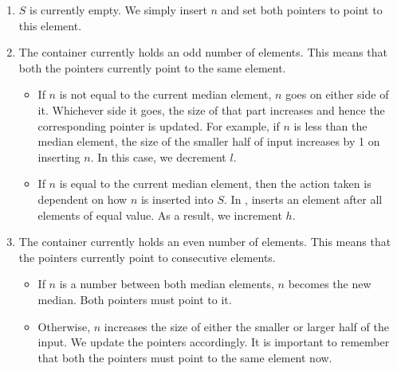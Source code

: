 \begin{enumerate}
\item $S$ is currently empty. We simply insert $n$ and set both pointers to point to this element.

\item The container currently holds an odd number of elements. This means that both the pointers currently point to the same element.

\begin{itemize}
\item If $n$ is not equal to the current median element, $n$ goes on either side of it. Whichever side it goes, the size of that part increases and hence the corresponding pointer is updated. For example, if $n$ is less than the median element, the size of the smaller half of input increases by 1 on inserting $n$. In this case, we decrement $l$.
\item If $n$ is equal to the current median element, then the action taken is dependent on how $n$ is inserted into $S$. In ,  inserts an element after all elements of equal value. As a result, we increment $h$.
\end{itemize}

\item The container currently holds an even number of elements. This means that the pointers currently point to consecutive elements.

\begin{itemize}
\item If $n$ is a number between both median elements, $n$ becomes the new median. Both pointers must point to it.
\item Otherwise, $n$ increases the size of either the smaller or larger half of the input. We update the pointers accordingly. It is important to remember that both the pointers must point to the same element now.
\end{itemize}
\end{enumerate}

